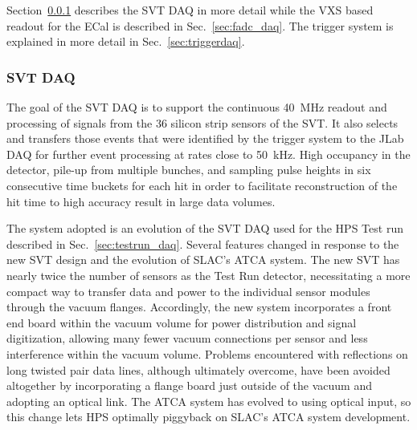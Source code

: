 Section~\ref{sec:svt_daq} describes the SVT DAQ in more detail while the VXS based readout for 
the ECal is described in Sec.~\ref{sec:fadc_daq}. The trigger 
system is explained in more detail in Sec.~\ref{sec:triggerdaq}.

\subsubsection{SVT DAQ}
\label{sec:svt_daq}
The goal of the SVT DAQ is to support the continuous 40~MHz readout and processing of signals from 
the 36 silicon strip sensors of the SVT. It also selects and transfers those events that were identified by the 
trigger system to the JLab DAQ for further event processing at rates 
close to 50~kHz.  
High occupancy in the detector, pile-up from multiple bunches,
and sampling pulse heights in six consecutive time buckets for each hit in order to facilitate 
reconstruction of the hit time to high accuracy result in large data volumes. 

The system adopted is an evolution of the SVT DAQ used for the HPS Test run described in 
Sec.~\ref{sec:testrun_daq}. Several features changed in
response to the new SVT design and the evolution of SLAC's ATCA system. The new SVT has nearly twice 
the number of sensors as the Test Run detector, 
necessitating a more compact way to transfer data and power to the individual sensor modules through the
vacuum flanges. Accordingly, the new system incorporates a front end board within the vacuum volume for 
power distribution and signal digitization,
allowing many fewer vacuum connections per sensor and less interference within the vacuum volume. 
Problems encountered with reflections on long twisted pair
data lines, although ultimately overcome, have been avoided altogether by incorporating a flange board just 
outside of the vacuum and adopting an optical link. The ATCA system has evolved to using optical input, so 
this change lets HPS optimally piggyback on SLAC's ATCA system development.  

